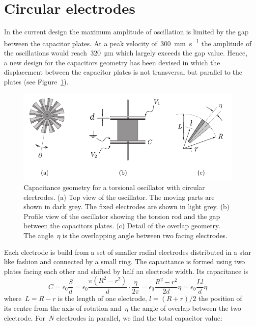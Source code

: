 \section{Circular electrodes}
\label{sec.circular}
In the current design the maximum amplitude of oscillation is limited by the gap between the capacitor plates. At a peak velocity of~\si{\num{300}\milli\meter\per\second} the amplitude of the oscillations would reach~\si{\num{320}\micro\meter} which largely exceeds the gap value. Hence, a new design for the capacitors geometry has been devised in which the displacement between the capacitor plates is not transversal but parallel to the plates (see Figure~\ref{fig.CapacitanceDesignCircular}).
\begin{figure}[h!]
	\captionsetup{width=.8\linewidth}
	\centering
	\includegraphics[width=12cm]{CircularCapacitanceValue2}
	\caption{ \small Capacitance geometry for a torsional oscillator with circular electrodes. (a) Top view of the oscillator. The moving parts are shown in dark grey. The fixed electrodes are shown in light grey. (b) Profile view of the oscillator showing the torsion rod and the gap between the capacitors plates. (c) Detail of the overlap geometry. The angle~$\eta$ is the overlapping angle between two facing electrodes.}
	\label{fig.CapacitanceDesignCircular}
\end{figure}
Each electrode is build from a set of smaller radial electrodes distributed in a star like fashion and connected by a small ring. The capacitance is formed using two plates facing each other and shifted by half an electrode width. Its capacitance is
\begin{equation}
C = \epsilon_0\frac{S}{d} =
\epsilon_0\frac{\pi(R^2 - r^2)}{d}\cdot\frac{\eta}{2\pi}=
\epsilon_0\frac{R^2 - r^2}{2d}\eta =
\epsilon_0\frac{L l}{d}\eta
\end{equation}
where~$L=R-r$ is the length of one electrode, $l=(R+r)/2$ the position of its centre from the axis of rotation and~$\eta$ the angle of overlap between the two electrode. For~$N$ electrodes in parallel, we find the total capacitor value:
